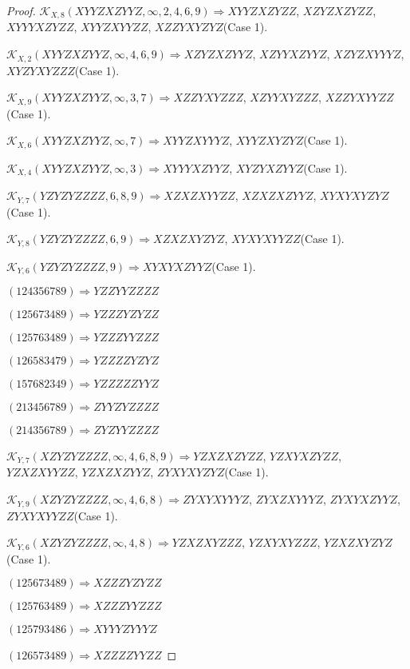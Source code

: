 \documentclass[12pt]{article}
\theoremstyle{plain}
\theoremstyle{definition}
\theoremstyle{remark}
\newcommand{\fancy}[1]{\mathcal{#1}}
\def\K{\fancy{K}}
\begin{document}
\begin{proof}
	
	
	$\K_{X,8}(XYYZXZYYZ,\infty,2, 4, 6, 9)\Rightarrow $$XYYZXZYZZ$, $XZYZXZYZZ$, $XYYYXZYZZ$, $XYYZXYYZZ$, $XZZYXYZYZ$(Case 1).
	
	$\K_{X,2}(XYYZXZYYZ,\infty,4, 6, 9)\Rightarrow $$XZYZXZYYZ$, $XZYYXZYYZ$, $XZYZXYYYZ$, $XYZYXYZZZ$(Case 1).
	
	$\K_{X,9}(XYYZXZYYZ,\infty,3, 7)\Rightarrow $$XZZYXYZZZ$, $XZYYXYZZZ$, $XZZYXYYZZ$(Case 1).
	
	$\K_{X,6}(XYYZXZYYZ,\infty,7)\Rightarrow $$XYYZXYYYZ$, $XYYZXYZYZ$(Case 1).
	
	$\K_{X,4}(XYYZXZYYZ,\infty,3)\Rightarrow $$XYYYXZYYZ$, $XYZYXZYYZ$(Case 1).
	
	$\K_{Y,7}(YZYZYZZZZ,6, 8, 9)\Rightarrow $$XZXZXYYZZ$, $XZXZXZYYZ$, $XYXYXYZYZ$(Case 1).
	
	$\K_{Y,8}(YZYZYZZZZ,6, 9)\Rightarrow $$XZXZXYZYZ$, $XYXYXYYZZ$(Case 1).
	
	$\K_{Y,6}(YZYZYZZZZ,9)\Rightarrow $$XYXYXZYYZ$(Case 1).
	
	
	
	$(1 2 4 3 5 6 7 8 9)\Rightarrow YZZYYZZZZ$
	
	$(1 2 5 6 7 3 4 8 9)\Rightarrow YZZZYZYZZ$
	
	$(1 2 5 7 6 3 4 8 9)\Rightarrow YZZZYYZZZ$
	
	$(1 2 6 5 8 3 4 7 9)\Rightarrow YZZZZYZYZ$
	
	$(1 5 7 6 8 2 3 4 9)\Rightarrow YZZZZZYYZ$
	
	$(2 1 3 4 5 6 7 8 9)\Rightarrow ZYYZYZZZZ$
	
	$(2 1 4 3 5 6 7 8 9)\Rightarrow ZYZYYZZZZ$
	
	
	
	$\K_{Y,7}(XZYZYZZZZ,\infty,4, 6, 8, 9)\Rightarrow $$YZXZXZYZZ$, $YZXYXZYZZ$, $YZXZXYYZZ$, $YZXZXZYYZ$, $ZYXYXYZYZ$(Case 1).
	
	$\K_{Y,9}(XZYZYZZZZ,\infty,4, 6, 8)\Rightarrow $$ZYXYXYYYZ$, $ZYXZXYYYZ$, $ZYXYXZYYZ$, $ZYXYXYYZZ$(Case 1).
	
	$\K_{Y,6}(XZYZYZZZZ,\infty,4, 8)\Rightarrow $$YZXZXYZZZ$, $YZXYXYZZZ$, $YZXZXYZYZ$(Case 1).
	
	
	
	$(1 2 5 6 7 3 4 8 9)\Rightarrow XZZZYZYZZ$
	
	$(1 2 5 7 6 3 4 8 9)\Rightarrow XZZZYYZZZ$
	
	$(1 2 5 7 9 3 4 8 6)\Rightarrow XYYYZYYYZ$
	
	$(1 2 6 5 7 3 4 8 9)\Rightarrow XZZZZYYZZ$
	

\end{proof}
\end{document}
